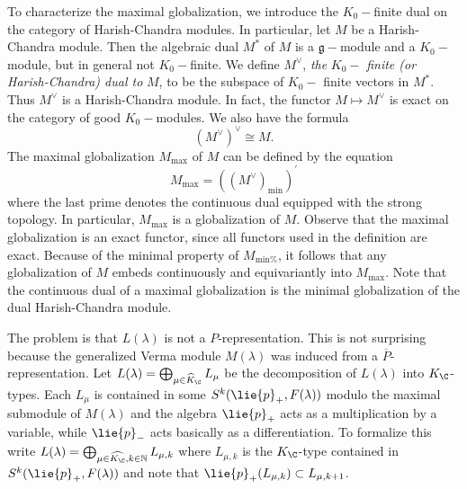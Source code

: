 \noindent To characterize the maximal globalization, we introduce the $%
K_{0}- $finite dual on the category of Harish-Chandra modules. In
particular, let $M $ be a Harish-Chandra module. Then the algebraic dual $%
M^{\ast }$ of $M$ is a $\mathfrak{g}-$module and a $K_{0}-$module, but in
general not $K_{0}-$finite. We define $M^{\vee }$, \emph{the} $K_{0}-$\emph{%
finite (or Harish-Chandra) dual to} $M$, to be the subspace of $K_{0}-$%
finite vectors in $M^{\ast }$. Thus $M^{\vee }$ is a Harish-Chandra module.
In fact, the functor $M\mapsto M^{\vee }$ is exact on the category of good $%
K_{0}-$modules. We also have the formula
\begin{equation*}
\left( M^{\vee }\right) ^{\vee }\cong M\text{.}
\end{equation*}%
The maximal globalization $M_{\text{max}}$ of $M$ can be defined by the
equation%
\begin{equation*}
M_{\text{max}}=\left( \left( M^{\vee }\right) _{\text{min}}\right) ^{\prime }
\end{equation*}%
where the last prime denotes the continuous dual equipped with the strong
topology. In particular, $M_{\text{max}}$ is a globalization of $M$. Observe
that the maximal globalization is an exact functor, since all functors used
in the definition are exact. Because of the minimal property of $M_{\text{min%
}}$, it follows that any globalization of $M$ embeds continuously and
equivariantly into $M_{\text{max}}$. Note that the continuous dual of a
maximal globalization is the minimal globalization of the dual
Harish-Chandra module.


The problem is that $L(\lambda)$ is not a $P$-representation.  This is not surprising because the generalized Verma module $M(\lambda)$ was induced from a $\overline{P}$-representation. Let $L(\lambda)=\bigoplus_{\mu\in \widehat{K}_\C} L_\mu$ be the decomposition of $L(\lambda)$ into $K_\C$-types. Each $L_\mu$ is contained in some $S^k(\lie{p}_+,F(\lambda))$ modulo the maximal submodule of $M(\lambda)$ and the algebra $\lie{p}_+$ acts  as a multiplication by a variable, while $\lie{p}_-$ acts basically as a differentiation. To formalize this write $L(\lambda) = \bigoplus_{\mu\in\widehat{K_\C}, k\in\mathbb{N}} L_{\mu,k}$ where $L_{\mu,k}$ is the $K_\C$-type contained in $S^k(\lie{p}_+,F(\lambda))$ and note that $\lie{p}_+ (L_{\mu,k}) \subset L_{\mu,k+1}$.

